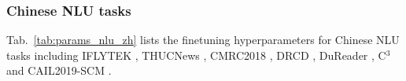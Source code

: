 \documentclass[11pt,a4paper]{article}
\newcommand{\mname}{\textsc{ERNIE-Doc}\xspace}
\begin{document}
\begin{table}[!h]
\centering
{}
\caption{Finetuning hyperparameters on the OpenKP for base-size \mname.}
\label{tab:params_kp_en}
\vspace{-0.5cm}
\end{table}

\subsubsection{Chinese NLU tasks}
Tab.~\ref{tab:params_nlu_zh} lists the finetuning hyperparameters for Chinese NLU tasks including IFLYTEK \citep{iflytek}, THUCNews \citep{thucnews}, CMRC2018 \citep{cmrc2018}, DRCD \citep{drcd}, DuReader \citet{dureader}, C$^3$ \citep{c3} and CAIL2019-SCM \citep{cail}.
\end{document}
